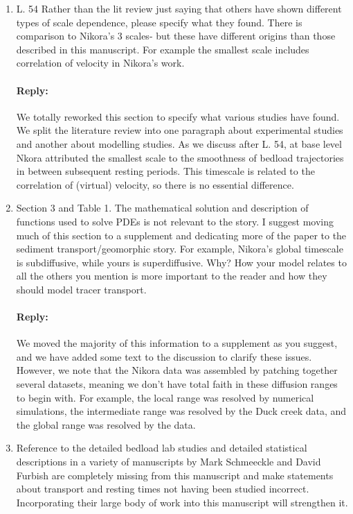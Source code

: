 \documentclass[11pt]{article}
\begin{document}
\begin{enumerate}
\item L. 54 Rather than the lit review just saying that others have shown different types of scale dependence, please specify what they found. There is comparison to Nikora's 3 scales- but these have different origins than those described in this manuscript. For example the smallest scale includes correlation of velocity in Nikora's work.
\paragraph{Reply:} 

We totally reworked this section to specify what various studies have found. We split the literature review into one paragraph about experimental studies and another about modelling studies. As we discuss after L. 54, at base level Nkora attributed the smallest scale to the smoothness of bedload trajectories in between subsequent resting periods. This timescale is related to the correlation of (virtual) velocity, so there is no essential difference.

\item Section 3 and Table 1. The mathematical solution and description of functions used to solve PDEs is not relevant to the story. I suggest moving much of this section to a supplement and dedicating more of the paper to the sediment transport/geomorphic story. For example, Nikora's global timescale is subdiffusive, while yours is superdiffusive. Why? How your model relates to all the others you mention is more important to the reader and how they should model tracer transport.
\paragraph{Reply:} 
We moved the majority of this information to a supplement as you suggest, and we have added some text to the discussion to clarify these issues. However, we note that the Nikora data was assembled by patching together several datasets, meaning we don't have total faith in these diffusion ranges to begin with. For example, the local range was resolved by numerical simulations, the intermediate range was resolved by the Duck creek data, and the global range was resolved by the \citet{Drake1988} data.

\item Reference to the detailed bedload lab studies and detailed statistical descriptions in a variety of manuscripts by Mark Schmeeckle and David Furbish are completely missing from this manuscript and make statements about transport and resting times not having been studied incorrect. Incorporating their large body of work into this manuscript will strengthen it.

\end{enumerate}
\end{document}
